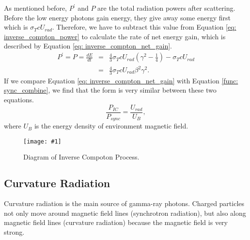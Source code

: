 \documentclass[a4paper, 12pt]{report}
\newcommand{\singleFig}[3]{
  \begin{figure}[!htp]
    \centering
    \texttt{[image: \#1]}
    \caption{#3}
    \label{fig: #1}
  \end{figure}
}
\begin{document}
      As mentioned before, $P^{\prime}$ and $P$ are the total radiation powers after 
      scattering. Before the low energy photons gain energy, they give away some energy 
      first which is $\sigma_{T} c U_{rad}$. 
      Therefore, we have to subtract this value from Equation \ref{eq: inverse_compton_power} 
      to calculate the rate of net energy gain, which is described by Equation 
      \ref{eq: inverse_compton_net_gain}.
      \begin{eqnarray}
        \label{eq: inverse_compton_net_gain}
        P^{\prime} = P = \frac{dE}{dt} &=& \frac{4}{3} \sigma_{T} c U_{rad} \left(\gamma^2 - \frac{1}{4}\right) - \sigma_{T} c U_{rad} \nonumber \\
                                          &=& \frac{4}{3} \sigma_{T} c U_{rad} \beta^{2} \gamma^{2} .
      \end{eqnarray}
      If we compare Equation \ref{eq: inverse_compton_net_gain} with 
      Equation \ref{func: sync_combine}, we find that the form is very similar between these 
      two equations. 
      \begin{equation}
        \label{eq: comparision_inverse_compton_and_sync}
        \frac{P_{IC}}{P_{sync}} = \frac{U_{rad}}{U_{B}} ,
      \end{equation}
      where $U_{B}$ is the energy density of environment magnetic field. 

      \vspace{1cm}
      \singleFig{inverse_compton_time_interval}{0.45}{Diagram of Inverse Compoton Process.}
    
    \subsection{Curvature Radiation}
      Curvature radiation is the main source of gamma-ray photons. Charged particles  
      not only move around magnetic field lines (synchrotron radiation), 
      but also along magnetic field lines (curvature radiation) because the magnetic 
      field is very strong.
\end{document}
